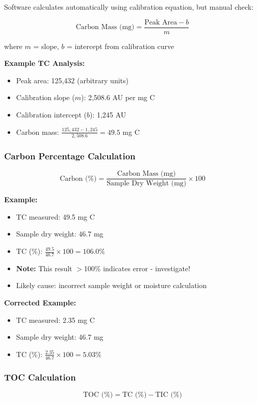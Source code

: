 \documentclass[11pt,a4paper]{article}\usepackage[]{graphicx}\usepackage[]{xcolor}
\begin{document}
Software calculates automatically using calibration equation, but manual check:

\begin{equation}
\text{Carbon Mass (mg)} = \frac{\text{Peak Area} - b}{m}
\end{equation}

where $m$ = slope, $b$ = intercept from calibration curve

\textbf{Example TC Analysis:}
\begin{itemize}[noitemsep]
    \item Peak area: 125,432 (arbitrary units)
    \item Calibration slope ($m$): 2,508.6 AU per mg C
    \item Calibration intercept ($b$): 1,245 AU
    \item Carbon mass: $\frac{125,432 - 1,245}{2,508.6} = 49.5$ mg C
\end{itemize}

\subsubsection{Carbon Percentage Calculation}
\begin{equation}
\text{Carbon (\%)} = \frac{\text{Carbon Mass (mg)}}{\text{Sample Dry Weight (mg)}} \times 100
\end{equation}

\textbf{Example:}
\begin{itemize}[noitemsep]
    \item TC measured: 49.5 mg C
    \item Sample dry weight: 46.7 mg
    \item TC (\%): $\frac{49.5}{46.7} \times 100 = 106.0\%$ 
    \item \textbf{Note:} This result $>$100\% indicates error - investigate!
    \item Likely cause: incorrect sample weight or moisture calculation
\end{itemize}

\textbf{Corrected Example:}
\begin{itemize}[noitemsep]
    \item TC measured: 2.35 mg C
    \item Sample dry weight: 46.7 mg
    \item TC (\%): $\frac{2.35}{46.7} \times 100 = 5.03\%$
\end{itemize}

\subsubsection{TOC Calculation}
\begin{equation}
\text{TOC (\%)} = \text{TC (\%)} - \text{TIC (\%)}
\end{equation}
\end{document}
